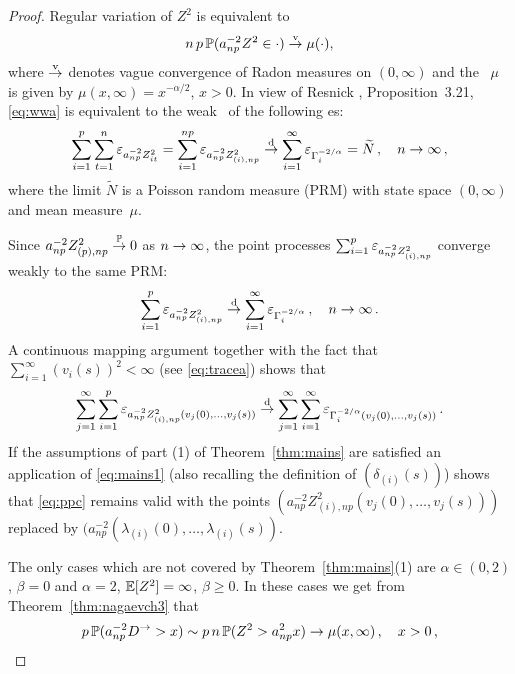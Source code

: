 \begin{proof}
Regular variation of $Z^2$ is equivalent to
\begin{equation}\label{eq:wwa}
n\,p\, \P(a_{np}^{-2} Z^2  \in \cdot ) \civ \mu(\cdot),
\end{equation}
where $\civ$ denotes vague convergence of Radon measures on  $(0,\infty)$ and the \ms\ $\mu$ is given by $\mu(x,\infty)=x^{-\alpha/2}$, $x>0$.
In view of Resnick \cite{resnick:1987}, Proposition~3.21, \eqref{eq:wwa} is equivalent
to the weak \con\ of the following \pp es:
\begin{equation*}
\sum_{i=1}^p\sum_{t=1}^n \vep_{a_{np}^{-2} Z_{it}^2}=\sum_{i=1}^{np} \vep_{a_{np}^{-2} Z^2_{(i),np}}\cid
\sum_{i=1}^\infty\vep_{\Gamma_i^{-2/\alpha} }=\widetilde{N}\,,\quad
\nto\,,
\end{equation*}
where the limit $\widetilde{N}$ is a Poisson random measure (PRM) with state space $(0,\infty)$ and
mean measure~$\mu$.
\par
Since $a_{np}^{-2} Z^2_{(p),np}\cip 0$ as $\nto$,
the point processes $\sum_{i=1}^{p} \vep_{a_{np}^{-2} Z^2_{(i),np}}$ converge weakly to the same PRM:
\begin{equation}\label{eq:ppc}
\sum_{i=1}^{p} \vep_{a_{np}^{-2} Z^2_{(i),np}}\cid
\sum_{i=1}^\infty\vep_{\Gamma_i^{-2/\alpha} }\,,\quad
\nto\,.
\end{equation}
A continuous mapping argument together with the fact that $\sum_{i=1}^\infty (v_i(s))^2<\infty$ (see  \eqref{eq:tracea})
shows that
\begin{equation*}
\sum_{j=1}^{ \infty}\sum_{i=1}^p\vep_{a_{np}^{-2} Z^2_{(i),np}(v_j(0),\ldots,v_j(s))}\cid
\sum_{j=1}^{ \infty}\sum_{i=1}^\infty\vep_{\Gamma_i^{-2/\alpha}  (v_j(0),\ldots,v_j(s))}\,.
\end{equation*}
If the assumptions of part (1) of Theorem~\ref{thm:mains} are satisfied
an application of \eqref{eq:mains1} (also recalling the definition of $(\delta_{(i)}(s))$) shows that \eqref{eq:ppc} remains
valid with the points  $(a_{np}^{-2} Z^2_{(i),np}(v_j(0),\ldots,v_j(s)))$ replaced by
$(a_{np}^{-2} (\lambda_{(i)}(0),\ldots,\lambda_{(i)}(s))$.
\par
The only cases which are not covered by Theorem~\ref{thm:mains}(1) are $\alpha\in (0,2)$, $\beta=0$ and $\alpha=2$, $\E[Z^2]=\infty$, $\beta\ge0$.
In these cases we get from Theorem~\ref{thm:nagaevch3} that
\begin{equation*}
 p \, \P(a_{np}^{-2} D^\rightarrow>x ) \sim p\,n\, \P( Z^2>a_{np}^{2} x )\to \mu(x,\infty)\,,\quad x>0\,,
\end{equation*}

\end{proof}
